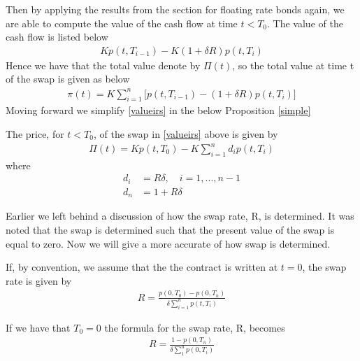 Then by applying the results from the section for floating rate bonds again, we are able to compute the value of the 
cash flow at time $t<T_0$. The value of the cash flow is listed below
\begin{align*}
    K p(t,T_{i-1})-K(1+\delta R)p(t,T_i)
\end{align*}
Hence we have that the total value denote by $\Pi(t)$, so the total value at time t of the swap is given as below
\begin{align}
    \pi (t) = K \sum_{i=1}^{n} \Big[p(t,T_{i-1})-(1+ \delta R)p(t,T_i)\Big]
    \label{valueirs}
\end{align}
Moving forward we simplify \autoref{valueirs} in the below Proposition \ref{simple} \cite{Bjork}
\begin{proposition}
    The price, for $t<T_0$, of the swap in \autoref{valueirs} above
    is given by 
    \begin{align*}
        \Pi(t) = K p(t,T_0)-K \sum_{i=1}^{n}d_i p(t,T_i)
    \end{align*}
    where
    \begin{align*}
        d_i &= R \delta, \quad i=1,...,n-1 \\
        d_n &= 1+ R \delta
    \end{align*}
    \label{simple}
\end{proposition}
\noindent 
Earlier we left behind a discussion of how the swap rate, R,  is determined. 
It was noted that the swap is determined such that the present value of
the swap is equal to zero. Now we will give a more accurate of how swap is determined.
\begin{proposition}
    If, by convention, we assume that the the contract is written at $t=0$, 
    the swap rate is given by \cite{Bjork}
    \begin{align*}
        R = \frac{p(0,T_0)-p(0,T_n)}{\delta \sum_{i=1}^{n}p(t,T_i)}
    \end{align*}
\end{proposition}
\noindent 
If we have that $T_0=0$ the formula for the swap rate, R, becomes
\begin{align*}
    R= \frac{1-p(0,T_n)}{\delta \sum_{1}^{n}p(0,T_i)}
\end{align*}
